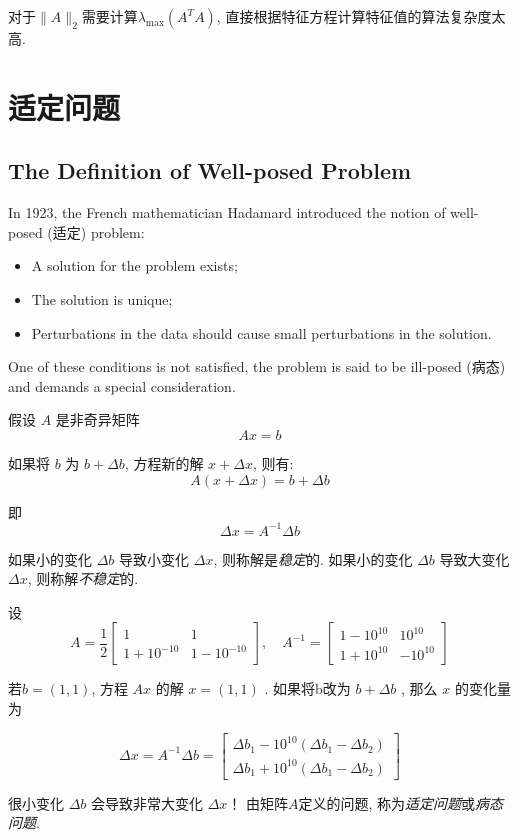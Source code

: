 \begin{remark}
    对于$\|A\|_{2}$需要计算$\lambda_{\max }\left(A^{T} A\right)$, 直接根据特征方程计算特征值的算法复杂度太高.
\end{remark}

\chapter{适定问题}

\section{The Definition of Well-posed Problem}

In 1923, the French mathematician Hadamard introduced the notion of well-posed (适定)  problem:

\begin{itemize}
    \item A solution for the problem exists;
    \item The solution is unique;
    \item Perturbations in the data should cause small perturbations in the solution.
\end{itemize}

One of these conditions is not satisfied, the problem is said to be ill-posed (病态) and demands a special consideration.

\begin{example}
    假设 $ A $ 是非奇异矩阵 $$ A x=b $$

    如果将 $ b $ 为 $ b+\Delta b $, 方程新的解 $ x+\Delta x $, 则有:
$$
A(x+\Delta x)=b+\Delta b
$$

即
$$
\Delta x=A^{-1} \Delta b
$$

如果小的变化 $ \Delta b $ 导致小变化 $ \Delta x $, 则称解是\textit{稳定}的. 如果小的变化 $ \Delta b $ 导致大变化 $ \Delta x $, 则称解\textit{不稳定}的. 

设$$ A=\frac{1}{2}\left[\begin{array}{cc}1 & 1 \\ 1+10^{-10} & 1-10^{-10}\end{array}\right], \quad A^{-1}=\left[\begin{array}{cc}1-10^{10} & 10^{10} \\ 1+10^{10} & -10^{10}\end{array}\right] $$

若$ b=(1,1) $, 方程 $ A x $ 的解 $ x=(1,1) $ . 
如果将b改为 $ b+\Delta b $ , 那么 $ x $ 的变化量为

$$ \Delta x=A^{-1} \Delta b=\left[\begin{array}{l}\Delta b_{1}-10^{10}\left(\Delta b_{1}-\Delta b_{2}\right) \\ \Delta b_{1}+10^{10}\left(\Delta b_{1}-\Delta b_{2}\right)\end{array}\right] $$

很小变化 $ \Delta b $ 会导致非常大变化 $ \Delta x $！ 由矩阵$A$定义的问题, 称为\textit{适定问题}或\textit{病态问题}. 

\end{example}


